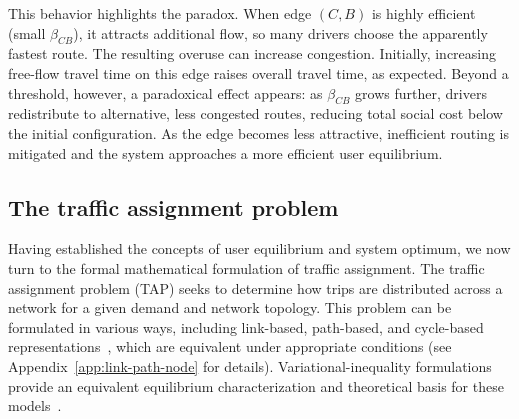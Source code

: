 \documentclass[twocolumn,english,groupedaddress, superscriptaddress,aps,pre,10pt,floatfix]{revtex4-2}
\begin{document}
This behavior highlights the paradox. When edge $(C,B)$ is highly efficient (small $\beta_{CB}$), it attracts additional flow, so many drivers choose the apparently fastest route. The resulting overuse can increase congestion. Initially, increasing free-flow travel time on this edge raises overall travel time, as expected. Beyond a threshold, however, a paradoxical effect appears: as $\beta_{CB}$ grows further, drivers redistribute to alternative, less congested routes, reducing total social cost below the initial configuration. As the edge becomes less attractive, inefficient routing is mitigated and the system approaches a more efficient user equilibrium.

\subsection{The traffic assignment problem}
Having established the concepts of user equilibrium and system optimum, we now turn to the formal mathematical formulation of traffic assignment. The traffic assignment problem (TAP) seeks to determine how trips are distributed across a network for a given demand and network topology. This problem can be formulated in various ways, including link-based, path-based, and cycle-based representations~\cite{ahuja1995network}, which are equivalent under appropriate conditions (see Appendix~\ref{app:link-path-node} for details). Variational-inequality formulations provide an equivalent equilibrium characterization and theoretical basis for these models~\cite{dafermos1980traffic}.\\
\end{document}
